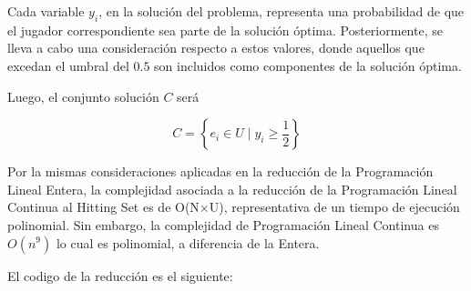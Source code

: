 Cada variable $y_i$, en la solución del problema, representa una probabilidad de que el jugador correspondiente sea parte de la solución óptima. Posteriormente, se lleva a cabo una consideración respecto a estos valores, donde aquellos que excedan el umbral del $0.5$ son incluidos como componentes de la solución óptima.

Luego, el conjunto solución $C$ será

\[
    C = \left\{e_i \in U \mid y_{i} \geq \frac{1}{2}\right\}
\]

Por la mismas consideraciones aplicadas en la reducción de la Programación Lineal Entera, la complejidad asociada a la reducción de la Programación Lineal Continua al Hitting Set es de O(N×U), representativa de un tiempo de ejecución polinomial.
Sin embargo, la complejidad de Programación Lineal Continua es $O(n^9)$ lo cual es polinomial, a diferencia de la Entera. 

El codigo de la reducción es el siguiente:

